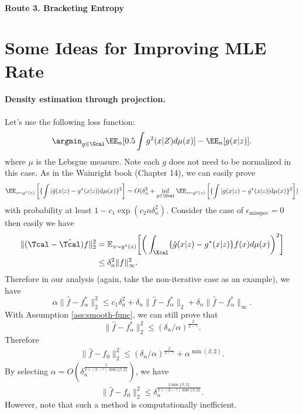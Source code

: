 \documentclass[12pt]{extarticle} %
\newcommand{\misp}{\epsilon_{\text{misspec}}}
\newcommand{\E}{\mathbb{E}}
\begin{document}
\paragraph{Route 3. Bracketing Entropy \cite{bilodeau2023minimax}}
\section{Some Ideas for Improving MLE Rate}
\paragraph{Density estimation through projection.}Let's use the following loss function:
\begin{align*}
    \argmin_{g \in \Gcal}\EE_n[0.5\int g^2(x|Z)d\mu(x)]-\EE_n[g(x|z)].  
\end{align*}
where $\mu$ is the Lebsgue measure. Note each $g$ does not need to be normalized in this case. 
As in the Wainright book (Chapter 14), we can easily prove $$\EE_{z \sim g^{\star}(z)}\left[\{\int |\hat g(x|z)-g^{\star}(x|z)| \mathrm{d}\mu(x)\}^2\right]=O(\delta_n^2+\inf_{g\in \Gcal}\EE_{z \sim g^{\star}(z)}\left[\{\int | g(x|z)-g^{\star}(x|z)| \mathrm{d}\mu(x)\}^2\right])$$
with probability at least $1 - c_1 \exp(c_2n\delta_n^2)$. Consider the case of $\misp = 0$ then easily we have \begin{align*}
    \|(\Tcal - \hat{\Tcal}) f\|_2^2 &= \E_{z\sim g^*(z)}\bigg[\bigg(\int_{\Xcal} \{\hat{g}(x|z) - g^*(x| z)\}f(x)d\mu(x)\bigg)^2\bigg]\\
    &\leq \delta_n^2 \|f\|_\infty^2 .
\end{align*}
Therefore in our analysis (again, take the non-iterative case as an example), we have $$
\alpha \| \hat{f} - f^*_\alpha\|_2^2 \leq c_1 \delta_n^2 + \delta_n \| \hat{f} - f^*_\alpha\|_2 + \delta_n \|\hat{f} - f_\alpha^*\|_\infty.
$$
With Assumption \ref{ass:smooth-func}, we can still prove that $$
\|\hat{f} - f_\alpha^*\|_2^2 \leq (\delta_n/\alpha)^{\frac{2}{2-\gamma}}.
$$
Therefore \begin{align*}
    \|\hat f-f_0 \|^2_2\leq  (\delta_n/\alpha)^{\frac{2}{2-\gamma}}+ \alpha^{\min(\beta,2)}.
\end{align*}
By selecting $\alpha = O(\delta_n^{\frac{2}{2+ (2 - \gamma)\min\{\beta,2\}}})$, we have $$
\|\hat f-f_0 \|^2_2\leq \delta_n^{\frac{2\min\{\beta,2\}}{2+ (2 - \gamma)\min\{\beta,2\}}}.
$$
However, note that such a method is computationally inefficient. 
\end{document}
